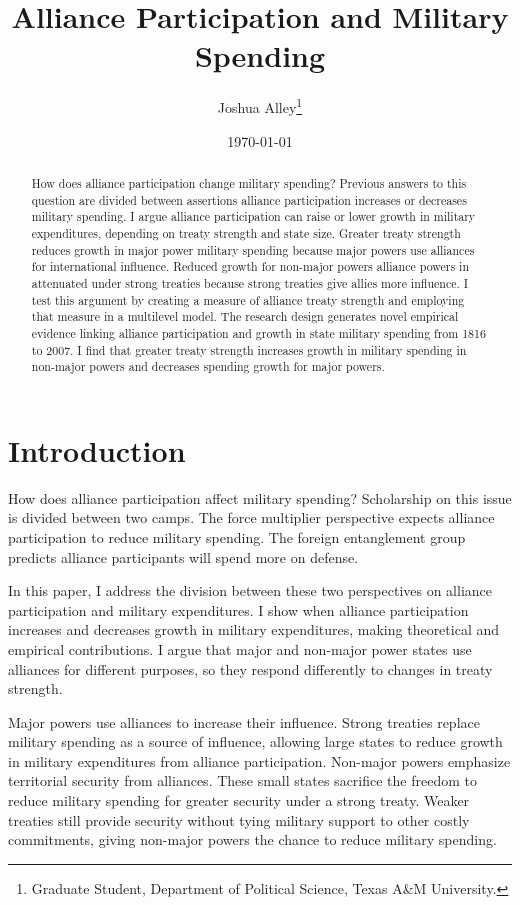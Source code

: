 \documentclass[12pt]{article}
\title{\textbf{Alliance Participation and Military Spending}}
\author{Joshua Alley\footnote{Graduate Student,
Department of Political Science, Texas A\&M University.}}
\date{{\normalsize \today}}
\begin{document}
\maketitle 

\newpage 

\doublespace 

\begin{abstract}
How does alliance participation change military spending? 
Previous answers to this question are divided between assertions alliance participation increases or decreases military spending. 
I argue alliance participation can raise or lower growth in military expenditures, depending on treaty strength and state size. 
Greater treaty strength reduces growth in major power military spending because major powers use alliances for international influence. 
Reduced growth for non-major powers alliance powers in attenuated under strong treaties because strong treaties give allies more influence. 
I test this argument by creating a measure of alliance treaty strength and employing that measure in a multilevel model. 
The research design generates novel empirical evidence linking alliance participation and growth in state military spending from 1816 to 2007. 
I find that greater treaty strength increases growth in military spending in non-major powers and decreases spending growth for major powers.  
\end{abstract}



\section{Introduction}


How does alliance participation affect military spending? 
Scholarship on this issue is divided between two camps. 
The force multiplier perspective expects alliance participation to reduce military spending. 
The foreign entanglement group predicts alliance participants will spend more on defense. 


In this paper, I address the division between these two perspectives on alliance participation and military expenditures. 
I show when alliance participation increases and decreases growth in military expenditures, making theoretical and empirical contributions. 
I argue that major and non-major power states use alliances for different purposes, so they respond differently to changes in treaty strength.


Major powers use alliances to increase their influence. 
Strong treaties replace military spending as a source of influence, allowing large states to reduce growth in military expenditures from alliance participation. 
Non-major powers emphasize territorial security from alliances.  
These small states sacrifice the freedom to reduce military spending for greater security under a strong treaty. 
Weaker treaties still provide security without tying military support to other costly commitments, giving non-major powers the chance to reduce military spending. 
\end{document}
